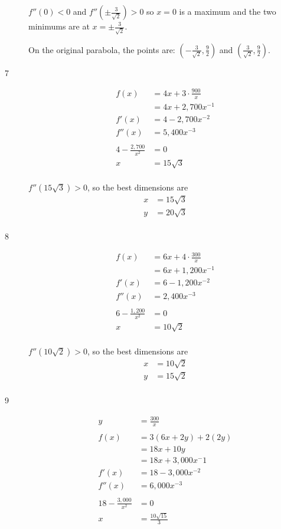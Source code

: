 \documentclass[fleqn]{exam}
\begin{document}
\begin{description}
$f''(0) < 0$ and $f'' \left( \pm \frac{3}{\sqrt{2}} \right) > 0$ so $x = 0$ is a maximum and the two minimums are at
$x = \pm \frac{3}{\sqrt{2}}$.

On the original parabola, the points are: $\left( -\frac{3}{\sqrt{2}}, \frac{9}{2} \right)$
and $\left( \frac{3}{\sqrt{2}}, \frac{9}{2} \right)$.

\item[7]
\begin{align*}
  f(x)   &= 4x + 3 \cdot \frac{900}{x} \\
         &= 4x + 2,700 x^{-1} \\
  f'(x)  &= 4 -  2,700 x^{-2} \\
  f''(x) &= 5,400 x^{-3} \\  
\\
  4 -  \frac{2,700}{x^2} &= 0 \\
  x &= 15 \sqrt{3} \\
\end{align*}

$f''(15\sqrt{3}) > 0$, so the best dimensions are
\begin{align*}
  x &= 15 \sqrt{3} \\
  y &= 20 \sqrt{3} \\
\end{align*}

\item[8]
\begin{align*}
  f(x)   &= 6x + 4 \cdot \frac{300}{x} \\
         &= 6x + 1,200 x^{-1} \\
  f'(x)  &= 6 -  1,200 x^{-2} \\
  f''(x) &= 2,400 x^{-3} \\  
\\
  6 -  \frac{1,200}{x^2} &= 0 \\
  x &= 10 \sqrt{2} \\
\end{align*}

$f''(10 \sqrt{2}) > 0$, so the best dimensions are 
\begin{align*}
  x &= 10 \sqrt{2} \\
  y &= 15 \sqrt{2} \\
\end{align*}

\item[9]
\begin{align*}
  y &= \frac{300}{x} \\
\\
  f(x)   &= 3(6x + 2y) + 2(2y) \\
         &= 18x + 10y \\
         &= 18x + 3,000 x^-1 \\
  f'(x)  &= 18 -  3,000 x^{-2} \\
  f''(x) &= 6,000 x^{-3} \\  
\\
  18 -  \frac{3,000}{x^2} &= 0 \\
  x &= \frac{10 \sqrt{15}}{3} \\
\end{align*}


\end{description}
\end{document}
